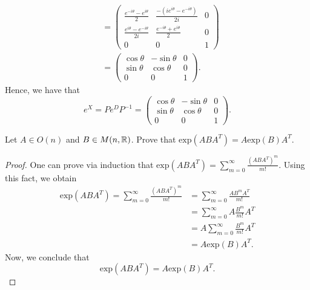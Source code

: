 \documentclass[a4paper]{article}
\begin{document}
\begin{solution}
\begin{align*}
          &= \begin{pmatrix} \frac{ e^{-i \theta} - e^{i \theta} }{  2  }  & \frac{ - ( i e^{i \theta} -   e^{-i \theta})  }{  2i  }  & 0 \\ \frac{  e^{i \theta} -  e^{-i \theta} }{  2i  }  &  \frac{ e^{- i \theta} + e^{i \theta} }{  2  }  & 0  \\ 0 & 0 & 1  \end{pmatrix} \\
          &= \begin{pmatrix}  \cos \theta & - \sin \theta & 0 \\ \sin \theta & \cos \theta & 0 \\ 0 & 0 & 1  \end{pmatrix}. 
\end{align*}
Hence, we have that 
\[ e^{X} = P e^{D} P^{-1} = \begin{pmatrix} \cos \theta & - \sin \theta & 0 \\ \sin \theta & \cos \theta & 0 \\ 0 & 0 & 1  \end{pmatrix}.  \]
\end{solution}



\begin{problem}
    Let \( A \in O(n) \) and \( B \in M(n,\mathbb{R})  \). Prove that \( \text{exp}(A B A^{T})  = A \text{exp}(B) A^{T}.\)
\end{problem}
\begin{proof}
    One can prove via induction that \( \text{exp}(A B A^{T}) = \displaystyle \sum_{ m=0  }^{ \infty  } \frac{ (A B A^{T})^{m} }{ m! }  \). Using this fact, we obtain 
    \begin{align*}
        \text{exp}(A B A^{T}) = \sum_{ m= 0  }^{ \infty  } \frac{ (A B A^{T})^{m}  }{  m!  } &= \sum_{ m= 0  }^{ \infty  } \frac{ A B^{m} A^{T} }{ m!  }   \\
                                                                                             &= \sum_{ m=0  }^{ \infty  } A \frac{ B^{m} }{ m!  }  A^{T} \\
                                                                                             &= A \sum_{ m=0  }^{ \infty  } \frac{ B^{m} }{ m! }  A^{T} \\
                                                                                             &= A \text{exp}(B) A^{T}.
    \end{align*}
    Now, we conclude that 
    \[  \text{exp}(A B A^{T}) = A \text{exp}(B) A^{T}. \]
\end{proof}
\end{document}
